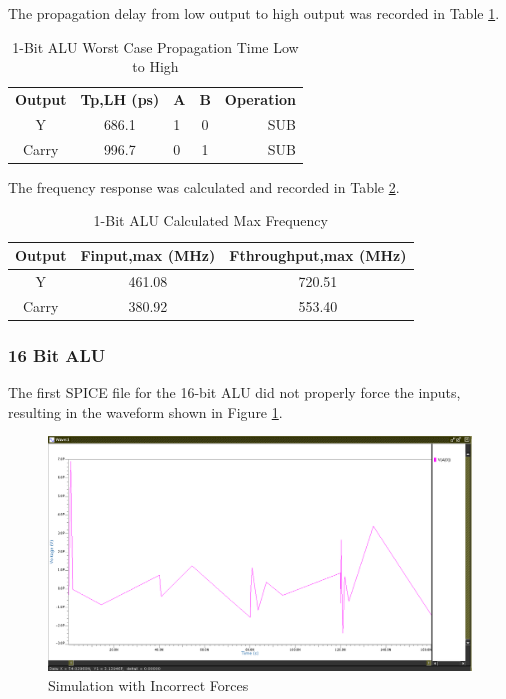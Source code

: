 \documentclass[11pt]{article}
\begin{document}
			The propagation delay from low output to high output was recorded in Table \ref{tab:ALU-1-Bit-Tpd-LH}.
		
			\begin{table}[H]
				\centering
				\caption{1-Bit ALU Worst Case Propagation Time Low to High}
				\label{tab:ALU-1-Bit-Tpd-LH}
				\begin{tabular}{|cclcr|}
					\hline
					\textbf{Output} & \textbf{Tp,LH (ps)} & \textbf{A} & \textbf{B} & \textbf{Operation} \\
					Y               & 686.1                   & 1          & 0          & SUB                \\
					Carry           & 996.7                   & 0          & 1          & SUB                \\
					\hline
				\end{tabular}
			\end{table}
		
			The frequency response was calculated and recorded in Table \ref{tab:ALU-1-Bit-Freq}.
		
			\begin{table}[H]
				\centering
				\caption{1-Bit ALU Calculated Max Frequency}
				\label{tab:ALU-1-Bit-Freq}
				\begin{tabular}{|ccc|}
					\hline
					\textbf{Output} & \textbf{Finput,max (MHz)} & \textbf{Fthroughput,max (MHz)} \\
					\hline
					Y               & 461.08                    & 720.51                         \\
					Carry           & 380.92                    & 553.40                         \\
					\hline
				\end{tabular}
			\end{table}
		
		\subsubsection{16 Bit ALU}
		
			The first SPICE file for the 16-bit ALU did not properly force the inputs, resulting in the waveform shown in Figure \ref{fig:terrible-simulation}.
		
			\begin{figure}[H]
				\centering
				\includegraphics[width=0.7\linewidth]{"Pictures/Terrible Simulation"}
				\caption{Simulation with Incorrect Forces}
				\label{fig:terrible-simulation}
			\end{figure}
			
\end{document}
